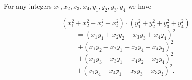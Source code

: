 For any integers $x_1, x_2, x_3, x_4, y_1, y_2, y_3, y_4$ we have

$$(x_1^2 + x_2^2 + x_3^2 + x_4^2) \cdot (y_1^2 + y_2^2 + y_3^2 + y_4^2)$$
$$= (x_1 y_1 + x_2 y_2 + x_3 y_3 + x_4 y_4)^2$$
$$+ (x_1 y_2 - x_2 y_1 + x_3 y_4 - x_4 y_3)^2$$
$$+ (x_1 y_3 - x_3 y_1 + x_4 y_2 - x_2 y_4)^2$$
$$+ (x_1 y_4 - x_4 y_1 + x_2 y_3 - x_3 y_2)^2.$$
